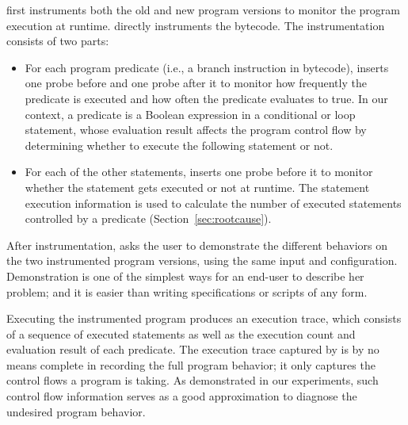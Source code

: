 \ourtool first instruments both the old and new program versions
to monitor the program  execution at runtime. \ourtool directly
instruments the bytecode. The instrumentation
consists of two parts:

\vspace{-2mm}

\begin{itemize}
\item For each program predicate (i.e., a branch instruction
in bytecode), \ourtool inserts one
probe before and one probe after it
to monitor how frequently the predicate is executed and
how often the predicate evaluates to true. In our
context, a predicate is a Boolean expression in a
conditional or loop statement,
whose evaluation result affects the program
control flow by determining whether to execute the
following statement or not.


\item For each of the other statements, \ourtool inserts
one probe before it to monitor whether the statement
gets executed or not at runtime. The statement execution
information is used to calculate the number of executed
statements controlled by a predicate (Section~\ref{sec:rootcause}).



\end{itemize}


\vspace{-1mm}

After instrumentation, \ourtool asks the user to demonstrate the different
behaviors on the two instrumented program versions, using
the same input and configuration. Demonstration is
one of the simplest ways for an end-user to describe her problem;
and it is easier than writing specifications or scripts of any form.

Executing the instrumented program produces an execution trace,
which consists of a sequence of executed statements as well
as the execution count and evaluation result of each predicate.
The execution trace captured by \ourtool is by no means complete
in recording the full program behavior; it only
captures the control flows a program is taking. As demonstrated
in our experiments, such control flow information serves as a
good approximation to diagnose the undesired program behavior.

